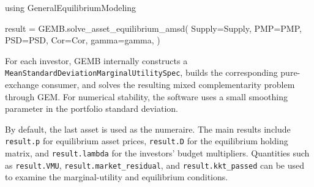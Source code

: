 \documentclass[
  letterpaper,
  DIV=11,
  numbers=noendperiod]{scrreprt}
\newenvironment{Shaded}{\begin{snugshade}}{\end{snugshade}}
\newcommand{\BuiltInTok}[1]{\textcolor[rgb]{0.00,0.23,0.31}{#1}}
\newcommand{\FunctionTok}[1]{\textcolor[rgb]{0.28,0.35,0.67}{#1}}
\newcommand{\ImportTok}[1]{\textcolor[rgb]{0.00,0.46,0.62}{#1}}
\newcommand{\NormalTok}[1]{\textcolor[rgb]{0.00,0.23,0.31}{#1}}
\newcommand{\OperatorTok}[1]{\textcolor[rgb]{0.37,0.37,0.37}{#1}}
\begin{document}
\begin{Shaded}
\begin{Highlighting}[]
\ImportTok{using} \BuiltInTok{GeneralEquilibriumModeling}

\NormalTok{result }\OperatorTok{=}\NormalTok{ GEMB.}\FunctionTok{solve\_asset\_equilibrium\_amsd}\NormalTok{(}
\NormalTok{    Supply}\OperatorTok{=}\NormalTok{Supply,}
\NormalTok{    PMP}\OperatorTok{=}\NormalTok{PMP,}
\NormalTok{    PSD}\OperatorTok{=}\NormalTok{PSD,}
\NormalTok{    Cor}\OperatorTok{=}\NormalTok{Cor,}
\NormalTok{    gamma}\OperatorTok{=}\NormalTok{gamma,}
\NormalTok{)}
\end{Highlighting}
\end{Shaded}

For each investor, GEMB internally constructs a
\texttt{MeanStandardDeviationMarginalUtilitySpec}, builds the
corresponding pure-exchange consumer, and solves the resulting mixed
complementarity problem through GEM. For numerical stability, the
software uses a small smoothing parameter in the portfolio standard
deviation.

By default, the last asset is used as the numeraire. The main results
include \texttt{result.p} for equilibrium asset prices,
\texttt{result.D} for the equilibrium holding matrix, and
\texttt{result.lambda} for the investors' budget multipliers. Quantities
such as \texttt{result.VMU}, \texttt{result.market\_residual}, and
\texttt{result.kkt\_passed} can be used to examine the marginal-utility
and equilibrium conditions.
\end{document}
